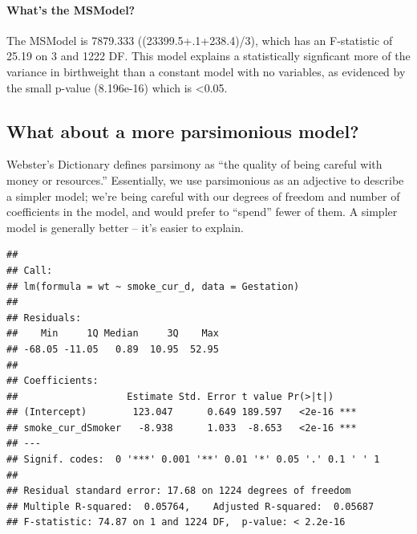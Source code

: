 \documentclass[]{article}
\newenvironment{Shaded}{\begin{snugshade}}{\end{snugshade}}
\newcommand{\DataTypeTok}[1]{\textcolor[rgb]{0.13,0.29,0.53}{#1}}
\newcommand{\DecValTok}[1]{\textcolor[rgb]{0.00,0.00,0.81}{#1}}
\newcommand{\KeywordTok}[1]{\textcolor[rgb]{0.13,0.29,0.53}{\textbf{#1}}}
\newcommand{\NormalTok}[1]{#1}
\newcommand{\OperatorTok}[1]{\textcolor[rgb]{0.81,0.36,0.00}{\textbf{#1}}}
\newcommand{\StringTok}[1]{\textcolor[rgb]{0.31,0.60,0.02}{#1}}
\let\oldparagraph\paragraph
\renewcommand{\paragraph}[1]{\oldparagraph{#1}\mbox{}}
\begin{document}
\hypertarget{whats-the-msmodel}{%
\paragraph{What's the MSModel?}\label{whats-the-msmodel}}

The MSModel is 7879.333 ((23399.5+.1+238.4)/3), which has an F-statistic
of 25.19 on 3 and 1222 DF. This model explains a statistically
signficant more of the variance in birthweight than a constant model
with no variables, as evidenced by the small p-value (8.196e-16) which
is \textless{}0.05.

\newpage

\hypertarget{what-about-a-more-parsimonious-model}{%
\subsection{What about a more parsimonious
model?}\label{what-about-a-more-parsimonious-model}}

Webster's Dictionary defines parsimony as ``the quality of being careful
with money or resources.'' Essentially, we use parsimonious as an
adjective to describe a simpler model; we're being careful with our
degrees of freedom and number of coefficients in the model, and would
prefer to ``spend'' fewer of them. A simpler model is generally better
-- it's easier to explain.

\begin{Shaded}
\end{Shaded}

\begin{verbatim}
## 
## Call:
## lm(formula = wt ~ smoke_cur_d, data = Gestation)
## 
## Residuals:
##    Min     1Q Median     3Q    Max 
## -68.05 -11.05   0.89  10.95  52.95 
## 
## Coefficients:
##                   Estimate Std. Error t value Pr(>|t|)    
## (Intercept)        123.047      0.649 189.597   <2e-16 ***
## smoke_cur_dSmoker   -8.938      1.033  -8.653   <2e-16 ***
## ---
## Signif. codes:  0 '***' 0.001 '**' 0.01 '*' 0.05 '.' 0.1 ' ' 1
## 
## Residual standard error: 17.68 on 1224 degrees of freedom
## Multiple R-squared:  0.05764,    Adjusted R-squared:  0.05687 
## F-statistic: 74.87 on 1 and 1224 DF,  p-value: < 2.2e-16
\end{verbatim}
\end{document}
